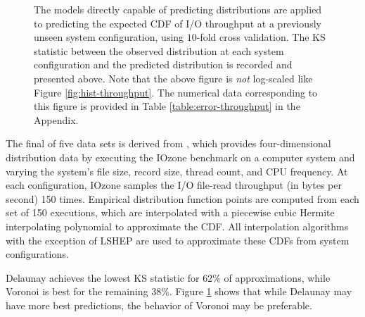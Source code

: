 \documentclass[smallextended,final]{svjour3}  %
\begin{document}
\begin{figure}
  \centering
  \caption{The models directly capable of predicting distributions are
    applied to predicting the expected CDF of I/O throughput at a
    previously unseen system configuration, using $10$-fold cross
    validation. The KS statistic between the observed distribution at
    each system configuration and the predicted distribution is
    recorded and presented above. Note that the above figure is
    \textit{not} log-scaled like Figure \ref{fig:hist-throughput}. The
    numerical data corresponding to this figure is provided in Table
    \ref{table:error-throughput} in the Appendix.}
  \label{fig:error-throughput}
\end{figure}

The final of five data sets is derived from \cite{cameron2019moana},
which provides four-dimensional distribution data by executing the
IOzone benchmark \cite{iozone} on a computer system and varying the
system's file size, record size, thread count, and CPU frequency. At
each configuration, IOzone samples the I/O file-read throughput (in
bytes per second) 150 times. Empirical distribution function points
are computed from each set of 150 executions, which are interpolated
with a piecewise cubic Hermite interpolating polynomial
\cite{fritsch1980monotone} to approximate the CDF. All interpolation
algorithms with the exception of LSHEP are used to approximate these
CDFs from system configurations.

Delaunay achieves the lowest KS statistic for $62\%$ of
approximations, while Voronoi is best for the remaining $38\%$. Figure
\ref{fig:error-throughput} shows that while Delaunay may have more
best predictions, the behavior of Voronoi may be preferable.
\end{document}
